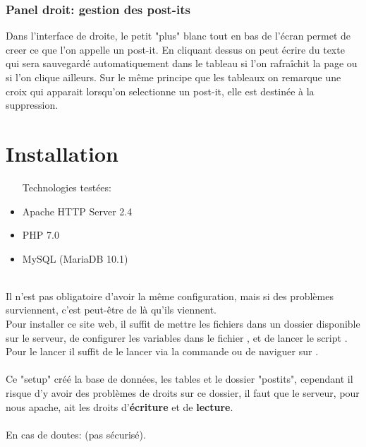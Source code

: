 \documentclass[a4paper, 11pt]{article}
\begin{document}
\subsubsection{Panel droit: gestion des post-its}
Dans l'interface de droite, le petit "plus" blanc tout en bas de l'écran permet 
de creer ce que l'on appelle un post-it. En cliquant dessus on peut écrire du texte qui sera sauvegardé 
automatiquement dans le tableau si l'on rafraîchit la page ou si l'on clique ailleurs.
Sur le même principe que les tableaux on remarque une croix qui apparait lorsqu'on selectionne un post-it, 
elle est destinée à la suppression.

\newpage

\section{Installation}

\begin{itemize} \itemsep2pt
  \item [Technologies testées:]
  \item Apache HTTP Server 2.4
  \item PHP 7.0
  \item MySQL (MariaDB 10.1)
\end{itemize}
\ \\

Il n'est pas obligatoire d'avoir la même configuration, mais si des problèmes surviennent,
c'est peut-être de là qu'ils viennent.
\\

Pour installer ce site web, il suffit de mettre les fichiers dans un dossier disponible sur le serveur,
de configurer les variables dans le fichier , et de lancer le script . \\
Pour le lancer il suffit de le lancer via la commande  ou de naviguer 
sur .\\ \\
Ce "setup" créé la base de données, les tables et le dossier "postits", cependant il risque d'y avoir des problèmes
de droits sur ce dossier, il faut que le serveur, pour nous apache, ait les droits d'\textbf{écriture} 
et de \textbf{lecture}. \\
\\
En cas de doutes:  (pas sécurisé).

\newpage
\end{document}
